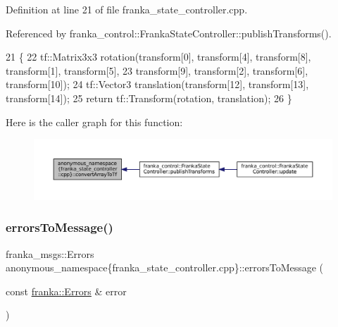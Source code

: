 Definition at line 21 of file franka\+\_\+state\+\_\+controller.\+cpp.



Referenced by franka\+\_\+control\+::\+Franka\+State\+Controller\+::publish\+Transforms().


\begin{DoxyCode}
21                                                                     \{
22   tf::Matrix3x3 rotation(transform[0], transform[4], transform[8], transform[1], transform[5],
23                          transform[9], transform[2], transform[6], transform[10]);
24   tf::Vector3 translation(transform[12], transform[13], transform[14]);
25   \textcolor{keywordflow}{return} tf::Transform(rotation, translation);
26 \}
\end{DoxyCode}
Here is the caller graph for this function\+:
\nopagebreak
\begin{figure}[H]
\begin{center}
\leavevmode
\includegraphics[width=350pt]{namespaceanonymous__namespace_02franka__state__controller_8cpp_03_aca5abe1f63ce51c9ac407aa423c9a0cf_icgraph}
\end{center}
\end{figure}
\mbox{\label{namespaceanonymous__namespace_02franka__state__controller_8cpp_03_a2ce17cf94c63412ee9586043b2ee3206}} 
\subsubsection{\texorpdfstring{errors\+To\+Message()}{errorsToMessage()}}
{\footnotesize\ttfamily franka\+\_\+msgs\+::\+Errors anonymous\+\_\+namespace\{franka\+\_\+state\+\_\+controller.\+cpp\}\+::errors\+To\+Message (\begin{DoxyParamCaption}\item[{const \hyperlink{structfranka_1_1Errors}{franka\+::\+Errors} \&}]{error }\end{DoxyParamCaption})}



